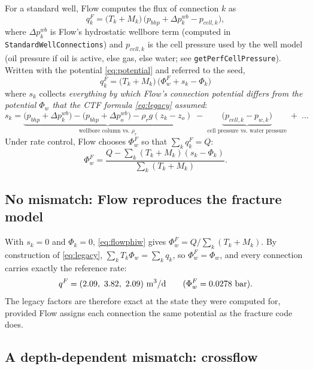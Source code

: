 \documentclass[11pt,a4paper]{article}
\newcommand{\Phiw}{\Phi_w}
\newcommand{\rated}{\si{m^3/d}}
\begin{document}
For a standard well, Flow computes the flux of connection $k$ as
\begin{equation}
  q^F_k=\big(T_k+M_k\big)\,\big(p_{bhp}+\Delta p^{wb}_k-p_{cell,k}\big),
\end{equation}
where $\Delta p^{wb}_k$ is Flow's hydrostatic wellbore term (computed in
\texttt{StandardWellConnections}) and $p_{cell,k}$ is the cell pressure used by the well model
(oil pressure if oil is active, else gas, else water; see \texttt{getPerfCellPressure}).  Written
with the potential \eqref{eq:potential} and referred to the seed,
\begin{equation}
  \boxed{\;q^F_k=\big(T_k+M_k\big)\,\big(\Phiw^F+s_k-\Phi_k\big)\;}
  \label{eq:flowconn}
\end{equation}
where $s_k$ collects \emph{everything by which Flow's connection potential differs from the
potential $\Phiw$ that the CTF formula \eqref{eq:legacy} assumed}:
\begin{equation}
  s_k = \underbrace{\big(p_{bhp}+\Delta p^{wb}_k\big)-\big(p_{bhp}+\Delta p^{wb}_o\big)
        -\rho_r g(z_k-z_o)}_{\text{wellbore column vs.\ }\rho_r}
        \;-\;\underbrace{\big(p_{cell,k}-p_{w,k}\big)}_{\text{cell pressure vs.\ water pressure}}
        \;+\;\dots
  \label{eq:sk}
\end{equation}
Under rate control, Flow chooses $\Phiw^F$ so that $\sum_k q^F_k=Q$:
\begin{equation}
  \Phiw^F=\frac{Q-\sum_k (T_k+M_k)(s_k-\Phi_k)}{\sum_k (T_k+M_k)} .
  \label{eq:flowphiw}
\end{equation}

\subsection{No mismatch: Flow reproduces the fracture model}

With $s_k=0$ and $\Phi_k=0$, \eqref{eq:flowphiw} gives $\Phiw^F=Q/\sum_k(T_k+M_k)$.  By
construction of \eqref{eq:legacy}, $\sum_k T_k\Phiw=\sum_k q_k$, so $\Phiw^F=\Phiw$, and every
connection carries exactly the reference rate:
\[
  q^F=(\qAtop,\ \qAmid,\ \qAbot)\ \text{\rated}\qquad(\Phiw^F=\phiwA~\text{bar}).
\]
The legacy factors are therefore exact at the state they were computed for, provided Flow
assigns each connection the same potential as the fracture code does.

\subsection{A depth-dependent mismatch: crossflow}
\end{document}
